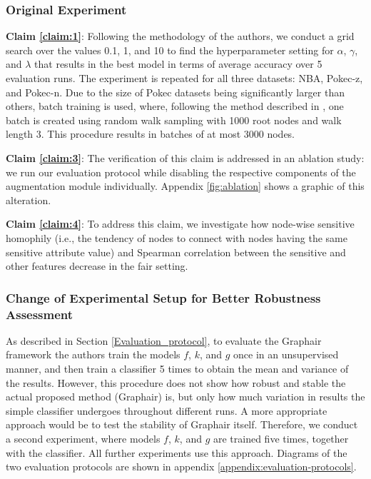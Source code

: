 \subsubsection{Original Experiment}
\label{sec:original-experiment}

\textbf{Claim \ref{claim:1}}: Following the methodology of the authors, we conduct a grid search over the values 0.1, 1, and 10 to find the hyperparameter setting for $\alpha$, $\gamma$, and $\lambda$ that results in the best model in terms of average accuracy over 5 evaluation runs. 
The experiment is repeated for all three datasets: NBA, Pokec-z, and Pokec-n. Due to the size of Pokec datasets being significantly larger than others, batch training is used, where, following the method described in \citep{Zeng2020GraphSAINT}, one batch is created using random walk sampling with 1000 root nodes and walk length 3. This procedure results in batches of at most 3000 nodes.

\textbf{Claim \ref{claim:3}}: The verification of this claim is addressed in an ablation study: we run our evaluation protocol while disabling the respective components of the augmentation module individually. Appendix \ref{fig:ablation} shows a graphic of this alteration.

\textbf{Claim \ref{claim:4}}: To address this claim, we investigate how node-wise sensitive homophily (i.e., the tendency of nodes to connect with nodes having the same sensitive attribute value) and Spearman correlation between the sensitive and other features decrease in the fair setting.

\subsubsection{Change of Experimental Setup for Better Robustness Assessment}

As described in Section \ref{Evaluation_protocol}, to evaluate the Graphair framework the authors train the models $f$, $k$, and $g$ once in an unsupervised manner, and then train a classifier 5 times to obtain the mean and variance of the results. 
However, this procedure does not show how robust and stable the actual proposed method (Graphair) is, but only how much variation in results the simple classifier undergoes throughout different runs. 
A more appropriate approach would be to test the stability of Graphair itself. 
Therefore, we conduct a second experiment, where models $f$, $k$, and $g$ are trained five times, together with the classifier.
All further experiments use this approach. Diagrams of the two evaluation protocols are shown in appendix \ref{appendix:evaluation-protocols}.

